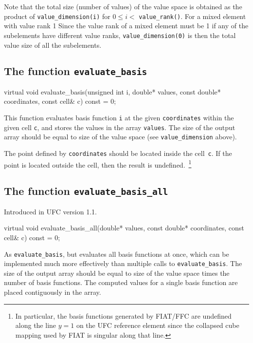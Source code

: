Note that the total size (number of values) of the value space is
obtained as the product of \texttt{value\_dimension(i)} for $0 \le i <$
\texttt{value\_rank()}. For a mixed element with value rank 1
Since the value rank of a mixed element must be 1 if any of the subelements
have different value ranks, \texttt{value\_dimension(0)} is then the total value
size of all the subelements.

\subsection{The function \texttt{evaluate\_basis}}

\begin{code}
virtual void evaluate_basis(unsigned int i,
                            double* values,
                            const double* coordinates,
                            const cell& c) const = 0;
\end{code}

This function evaluates basis function \texttt{i} at the given
\texttt{coordinates} within the given cell \texttt{c}, and stores the
values in the array \texttt{values}. The size of the output array
should be equal to size of the value space (see
\texttt{value\_dimension} above).

The point defined by \texttt{coordinates} should be located inside the
cell~\texttt{c}. If the point is located outside the cell, then the
result is undefined.~\footnote{In particular, the basis functions
  generated by FIAT/FFC are undefined along the line $y = 1$ on the
  UFC reference element since the collapsed cube mapping used by FIAT
  is singular along that line.}

\subsection{The function \texttt{evaluate\_basis\_all}}
Introduced in UFC version 1.1.

\begin{code}
virtual void evaluate_basis_all(double* values,
                                const double* coordinates,
                                const cell& c) const = 0;
\end{code}

As \texttt{evaluate\_basis}, but evaluates all basis functions at
once, which can be implemented much more effectively than multiple
calls to \texttt{evaluate\_basis}. The size of the output array
should be equal to size of the value space times the number of
basis functions. The computed values for a single basis function
are placed contiguously in the array.

